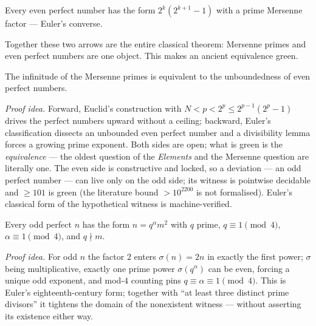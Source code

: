 \begin{theorem}\label{thm:evenPerfect_eq}
\green{}\; Every even perfect number has the form $2^k(2^{k+1}-1)$ with a prime Mersenne factor
--- Euler's converse. 
\end{theorem}

Together these two arrows are the entire classical theorem: Mersenne primes and even perfect
numbers are one object. This makes an ancient equivalence green.

\begin{theorem}\label{thm:mersennePrimesInfinite_iff_evenPerfectUnbounded}
\green{}\; The infinitude of the Mersenne primes is equivalent to the unboundedness of even
perfect numbers. 
\end{theorem}

\emph{Proof idea.} Forward, Euclid's construction with $N<p<2^p\le 2^{p-1}(2^p-1)$ drives the
perfect numbers upward without a ceiling; backward, Euler's classification dissects an unbounded
even perfect number and a divisibility lemma forces a growing prime exponent.
Both sides are open; what is green is the \emph{equivalence} --- the oldest question of the
\emph{Elements} and the Mersenne question are literally one. The even side is constructive and
locked, so a deviation --- an odd perfect number --- can live only on the odd side; its witness is
pointwise decidable and $\ge101$ is green (the literature bound $>10^{2200}$ is not formalised).
Euler's classical form of the hypothetical witness is machine-verified.

\begin{theorem}\label{thm:odd_perfect_euler_form}
\green{}\; Every odd perfect $n$ has the form $n=q^{\alpha}m^2$ with $q$ prime, $q\equiv1\pmod4$,
$\alpha\equiv1\pmod4$, and $q\nmid m$. 
\end{theorem}

\emph{Proof idea.} For odd $n$ the factor $2$ enters $\sigma(n)=2n$ in exactly the first power;
$\sigma$ being multiplicative, exactly one prime power $\sigma(q^\alpha)$ can be even, forcing a
unique odd exponent, and mod-$4$ counting pins $q\equiv\alpha\equiv1\pmod4$. This is Euler's
eighteenth-century form; together with ``at least three distinct prime divisors'' it tightens the
domain of the nonexistent witness --- without asserting its existence either way.

